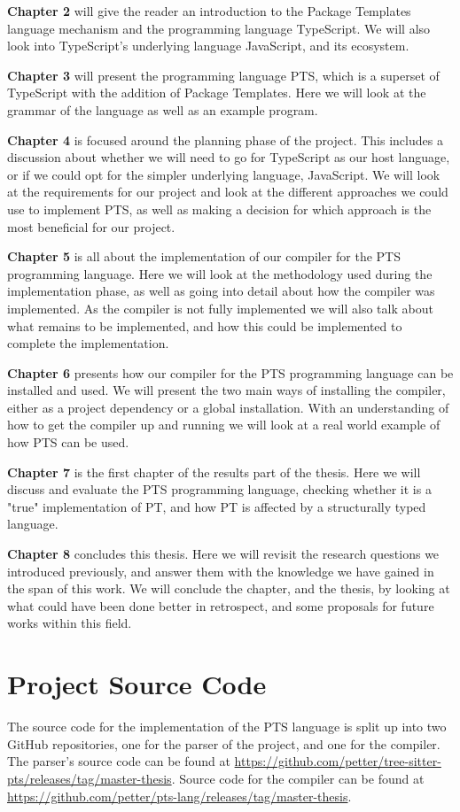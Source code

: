 \textbf{Chapter 2} will give the reader an introduction to the Package Templates language mechanism and the programming language TypeScript.
We will also look into TypeScript's underlying language JavaScript, and its ecosystem.

\textbf{Chapter 3} will present the programming language PTS, which is a superset of TypeScript with the addition of Package Templates.
Here we will look at the grammar of the language as well as an example program.

\textbf{Chapter 4} is focused around the planning phase of the project.
This includes a discussion about whether we will need to go for TypeScript as our host language, or if we could opt for the simpler underlying language, JavaScript.
We will look at the requirements for our project and look at the different approaches we could use to implement PTS, as well as making a decision for which approach is the most beneficial for our project.

\textbf{Chapter 5} is all about the implementation of our compiler for the PTS programming language.
Here we will look at the methodology used during the implementation phase, as well as going into detail about how the compiler was implemented.
As the compiler is not fully implemented we will also talk about what remains to be implemented, and how this could be implemented to complete the implementation.

\textbf{Chapter 6} presents how our compiler for the PTS programming language can be installed and used.
We will present the two main ways of installing the compiler, either as a project dependency or a global installation.
With an understanding of how to get the compiler up and running we will look at a real world example of how PTS can be used.

\textbf{Chapter 7} is the first chapter of the results part of the thesis.
Here we will discuss and evaluate the PTS programming language, checking whether it is a "true" implementation of PT, and how PT is affected by a structurally typed language.

\textbf{Chapter 8} concludes this thesis.
Here we will revisit the research questions we introduced previously, and answer them with the knowledge we have gained in the span of this work.
We will conclude the chapter, and the thesis, by looking at what could have been done better in retrospect, and some proposals for future works within this field.

\section{Project Source Code}\label{sec:project-source-code}

The source code for the implementation of the PTS language is split up into two GitHub repositories, one for the parser of the project, and one for the compiler.
The parser's source code can be found at \url{https://github.com/petter/tree-sitter-pts/releases/tag/master-thesis}.
Source code for the compiler can be found at \url{https://github.com/petter/pts-lang/releases/tag/master-thesis}.
